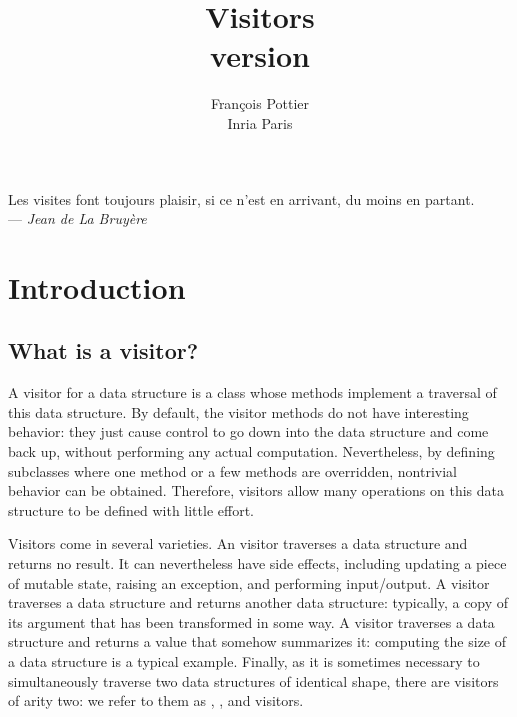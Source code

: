 \documentclass[11pt,a4paper,twoside]{article}
\title{Visitors\\\normalsize version \visitorsversion}
\date{}
\begin{document}
\author{François Pottier\\ Inria Paris\\ }
\maketitle


\clearpage
\tableofcontents
\clearpage


\begin{flushright}
  Les visites font toujours plaisir, si ce n'est en arrivant, du moins en
  partant. \\ --- \textit{Jean de La Bruyère}
\end{flushright}

\vspace{1cm}


\section{Introduction}
\label{sec:intro}


\subsection{What is a visitor?}

A visitor for a data structure is a class whose methods implement a traversal
of this data structure. By default, the visitor methods do not have
interesting behavior: they just cause control to go down into the data
structure and come back up, without performing any actual computation.
Nevertheless, by defining subclasses where one method or a few methods are
overridden, nontrivial behavior can be obtained. Therefore, visitors allow
many operations on this data structure to be defined with little effort.

Visitors come in several varieties. An \iter visitor traverses a data
structure and returns no result. It can nevertheless have side effects,
including updating a piece of mutable state, raising an exception, and
performing input/output. A \map visitor traverses a data structure and returns
another data structure: typically, a copy of its argument that has been
transformed in some way. A \reduce visitor traverses a data structure and
returns a value that somehow summarizes it: computing the size of a data
structure is a typical example. Finally, as it is sometimes necessary to
simultaneously traverse two data structures of identical shape, there are
visitors of arity two: we refer to them as \itertwo, \maptwo, and \reducetwo
visitors.
\end{document}
